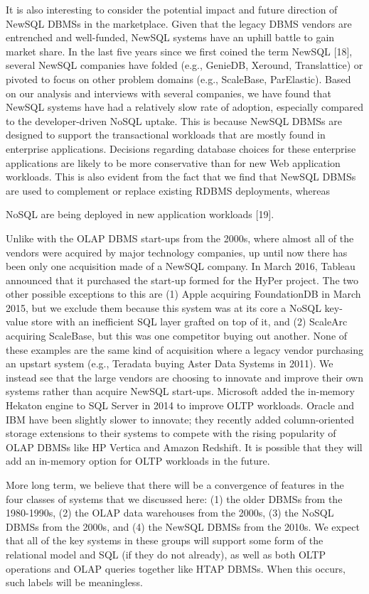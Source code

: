\documentclass[a4paper,11pt,twoside,openright]{article}
\begin{document}
It is also interesting to consider the potential impact and future
direction of NewSQL DBMSs in the marketplace. Given that the legacy DBMS
vendors are entrenched and well-funded, NewSQL systems have an uphill
battle to gain market share. In the last five years since we first
coined the term NewSQL {[}18{]}, several NewSQL companies have folded
(e.g., GenieDB, Xeround, Translattice) or pivoted to focus on other
problem domains (e.g., ScaleBase, ParElastic). Based on our analysis and
interviews with several companies, we have found that NewSQL systems
have had a relatively slow rate of adoption, especially compared to the
developer-driven NoSQL uptake. This is because NewSQL DBMSs are designed
to support the transactional workloads that are mostly found in
enterprise applications. Decisions regarding database choices for these
enterprise applications are likely to be more conservative than for new
Web application workloads. This is also evident from the fact that we
find that NewSQL DBMSs are used to complement or replace existing RDBMS
deployments, whereas

NoSQL are being deployed in new application workloads {[}19{]}.

Unlike with the OLAP DBMS start-ups from the 2000s, where almost all of
the vendors were acquired by major technology companies, up until now
there has been only one acquisition made of a NewSQL company. In March
2016, Tableau announced that it purchased the start-up formed for the
HyPer project. The two other possible exceptions to this are (1) Apple
acquiring FoundationDB in March 2015, but we exclude them because this
system was at its core a NoSQL key-value store with an inefficient SQL
layer grafted on top of it, and (2) ScaleArc acquiring ScaleBase, but
this was one competitor buying out another. None of these examples are
the same kind of acquisition where a legacy vendor purchasing an upstart
system (e.g., Teradata buying Aster Data Systems in 2011). We instead
see that the large vendors are choosing to innovate and improve their
own systems rather than acquire NewSQL start-ups. Microsoft added the
in-memory Hekaton engine to SQL Server in 2014 to improve OLTP
workloads. Oracle and IBM have been slightly slower to innovate; they
recently added column-oriented storage extensions to their systems to
compete with the rising popularity of OLAP DBMSs like HP Vertica and
Amazon Redshift. It is possible that they will add an in-memory option
for OLTP workloads in the future.

More long term, we believe that there will be a convergence of features
in the four classes of systems that we discussed here: (1) the older
DBMSs from the 1980-1990s, (2) the OLAP data warehouses from the 2000s,
(3) the NoSQL DBMSs from the 2000s, and (4) the NewSQL DBMSs from the
2010s. We expect that all of the key systems in these groups will
support some form of the relational model and SQL (if they do not
already), as well as both OLTP operations and OLAP queries together like
HTAP DBMSs. When this occurs, such labels will be meaningless.
\end{document}
